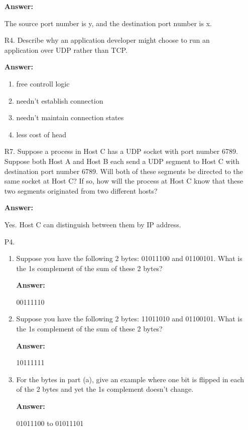 \begin{enumerate}
	\textbf{Answer:}
	
	The source port number is y, and the destination port number is x.
	
	\item[R4.] Describe why an application developer might choose to run an application over UDP rather than TCP.
	
	\textbf{Answer:}
	
	\begin{enumerate}
	    \item free controll logic
	    \item needn't establish connection
	    \item needn't maintain connection states
	    \item less cost of head
	\end{enumerate}
	
	\item[R7.] Suppose a process in Host C has a UDP socket with port number 6789. Suppose both Host A and Host B each send a UDP segment to Host C with destination port number 6789. Will both of these segments be directed to the same socket at Host C? If so, how will the process at Host C know that these two segments originated from two different hosts?
	
	\textbf{Answer:}
	
	Yes. Host C can distinguish between them by IP address.
	
	\item[P4.] 
	\begin{enumerate}
    	\item Suppose you have the following 2 bytes: 01011100 and 01100101. What is the 1s complement of the sum of these 2 bytes?
    	
    	\textbf{Answer:}
    	
    	00111110
    	
    	\item Suppose you have the following 2 bytes: 11011010 and 01100101. What is the 1s complement of the sum of these 2 bytes?
    	
    	\textbf{Answer:}
    	
    	10111111
    	
    	\item For the bytes in part (a), give an example where one bit is flipped in each of the 2 bytes and yet the 1s complement doesn’t change.
    	
    	\textbf{Answer:}
    	
    	01011100 to 01011101
    	

\end{enumerate}
\end{enumerate}
